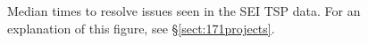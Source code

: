 \documentclass[smallcondensed]{svjour3}
\newcommand{\tion}[1]{\S\ref{sect:#1}}
\begin{document}
\begin{figure}
\begin{center}


\end{center}
\caption{Median times to resolve issues seen in the SEI TSP data. For an explanation of this figure,
see \tion{171projects}.}
\label{fig:raw}
\end{figure}
\end{document}
